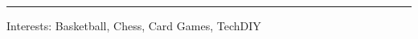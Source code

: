 \documentclass[letterpaper, 10pt, oneside]{article}
\newcommand{\bulltetspace}{\vspace{-0.3em}}
\newcommand{\sectionspace}{\vspace{-1em}}
\begin{document}
\begin{center}
\end{center}



\hrule
\vspace{0.5em}
Interests: Basketball, Chess, Card Games, TechDIY
\vspace{0em}
\end{document}
